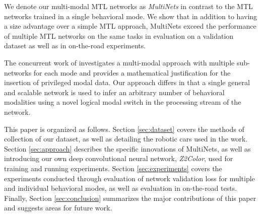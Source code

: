 We denote our multi-modal MTL networks as \textit{MultiNets} in contrast to the MTL networks trained in a single behavioral mode. We show that in addition to having a size advantage over a simple MTL approach, MultiNets exceed the performance of multiple MTL networks on the same tasks in evaluation on a validation dataset as well as in on-the-road experiments.

The concurrent work of \cite{intel_paper} investigates a multi-modal approach with multiple sub-networks for each mode and provides a mathematical justification for the insertion of privileged modal data. Our approach differs in that a single general and scalable network is used to infer an arbitrary number of behavioral modalities using a novel logical modal switch in the processing stream of the network.

This paper is organized as follows.
Section \ref{sec:dataset} covers the methods of collection of our dataset, as well as detailing the robotic cars used in the work.
Section \ref{sec:approach} describes the specific innovations of MultiNets, as well as introducing our own deep convolutional neural network, \textit{Z2Color}, used for training and running experiments.
Section \ref{sec:experiments} covers the experiments conducted through evaluation of network validation loss for multiple and individual behavioral modes, as well as evaluation in on-the-road tests.
Finally, Section \ref{sec:conclusion} summarizes the major contributions of this paper and suggests areas for future work.


